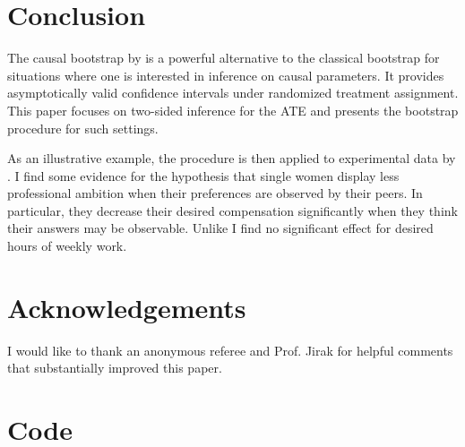 \documentclass[aodsor,preprint]{imsart}
\numberwithin{equation}{section}
\theoremstyle{plain}
\begin{document}
\section{Conclusion} \label{Conclusion}

The causal bootstrap by \cite{Imbens_2021} is a powerful alternative to the classical bootstrap for situations where one is interested in inference on causal parameters. It provides asymptotically valid confidence intervals under randomized treatment assignment. This paper focuses on two-sided inference for the ATE and presents the bootstrap procedure for such settings.

As an illustrative example, the procedure is then applied to experimental data by \cite{Bursztyn_2017}. I find some evidence for the hypothesis that single women display less professional ambition when their preferences are observed by their peers. In particular, they decrease their desired compensation significantly when they think their answers may be observable. Unlike \cite{Bursztyn_2017} I find no significant effect for desired hours of weekly work. 


\section*{Acknowledgements}

I would like to thank an anonymous referee and Prof. Jirak for helpful comments that substantially improved this paper.




\newpage

\appendix
\section{Code} \label{Code}
\end{document}
